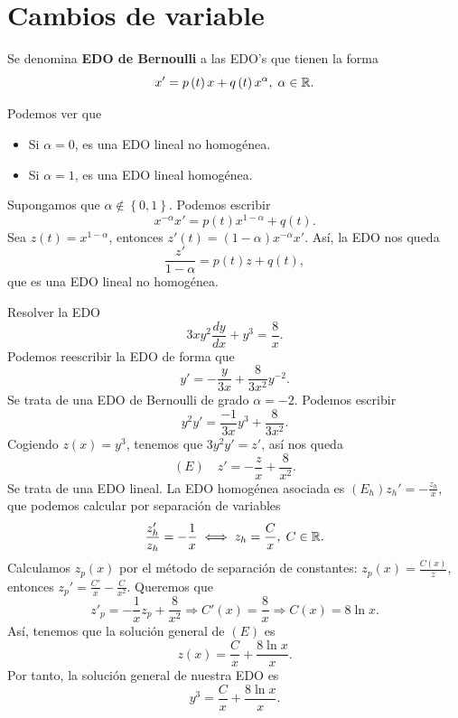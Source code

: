\section{Cambios de variable}
\begin{definition}
Se denomina \textbf{EDO de Bernoulli} a las EDO's que tienen la forma 
\[x'=p\left(t\right)x + q\left(t\right)x^{\alpha }, \; \alpha \in \mathbb{R} .\]
\end{definition}
\begin{observation}
Podemos ver que 
\begin{itemize}
\item Si $\displaystyle \alpha = 0 $, es una EDO lineal no homogénea.
\item Si $\displaystyle \alpha = 1 $, es una EDO lineal homogénea. 
\end{itemize}
\end{observation}
\begin{observation}
	Supongamos que $\displaystyle \alpha \not\in \left\{ 0,1\right\}  $. Podemos escribir
	\[x^{-\alpha }x' = p\left(t\right)x^{1-\alpha }+q\left(t\right) .\]
Sea $\displaystyle z\left(t\right)=x^{1-\alpha } $, entonces $\displaystyle z'\left(t\right)=\left(1-\alpha \right)x^{-\alpha }x' $. Así, la EDO nos queda
\[\frac{z'}{1-\alpha }=p\left(t\right)z + q\left(t\right) ,\]
que es una EDO lineal no homogénea. 
\end{observation}
\begin{eg}
Resolver la EDO
\[3xy^{2}\frac{dy}{dx}+y^{3}=\frac{8}{x} .\]
Podemos reescribir la EDO de forma que 
\[y' = -\frac{y}{3x}+\frac{8}{3x^{2}}y^{-2} .\]
Se trata de una EDO de Bernoulli de grado $\displaystyle \alpha = -2 $. Podemos escribir
\[y^{2}y' = \frac{-1}{3x}y^{3}+\frac{8}{3x^{2}} .\]
Cogiendo $\displaystyle z\left(x\right)=y^{3} $, tenemos que $\displaystyle 3y^{2}y' = z' $, así nos queda
\[\left(E\right) \quad z' = -\frac{z}{x}+\frac{8}{x^{2}} .\]
Se trata de una EDO lineal. La EDO homogénea asociada es $\displaystyle \left(E_{h}\right) z_{h}' = -\frac{z_{h}}{x} $, que podemos calcular por separación de variables
\[\frac{z_{h}'}{z_{h}}= -\frac{1}{x} \iff z_{h}=\frac{C}{x}, \; C \in \mathbb{R} .\]
Calculamos $\displaystyle z_{p}\left(x\right) $ por el método de separación de constantes: $\displaystyle z_{p}\left(x\right)=\frac{C\left(x\right)}{z} $, entonces $\displaystyle z_{p}' = \frac{C'}{x}-\frac{C}{x^{2}} $. Queremos que 
\[z'_{p}=-\frac{1}{x}z_{p} + \frac{8}{x^{2}} \Rightarrow C'\left(x\right)=\frac{8}{x} \Rightarrow C\left(x\right)=8\ln x .\]
Así, tenemos que la solución general de $\displaystyle \left(E\right) $ es
\[z\left(x\right)= \frac{C}{x} + \frac{8\ln x}{x} .\]
Por tanto, la solución general de nuestra EDO es
\[y^{3}=\frac{C}{x}+\frac{8\ln x}{x} .\]
\end{eg}

